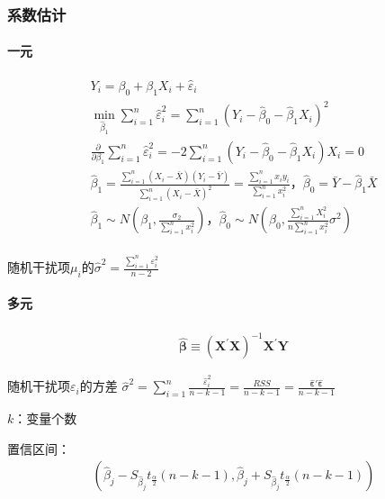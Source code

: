 \documentclass[12pt]{book}
\begin{document}
\subsubsection{系数估计}

\paragraph{一元}


\begin{gather*}
    Y_i = \beta_0+\beta_{1}X_{i}+{\hat{\varepsilon}}_i\\
    \min_{{\hat{\beta}}_1}{\sum_{i=1}^{n}{\hat{\varepsilon}}_i^2} =\sum_{i=1}^{n}{\left(Y_i-{\hat{\beta}}_0-{\hat{\beta}}_1 X_i\right)^2}\\
    \frac{\partial}{\partial \beta_{1}}  \sum_{i=1}^{n}{\hat{ε}_i^2} =-2\sum_{i=1}^{n}{(Y_i-\hat{\beta}_{0}-\hat{\beta}_{1} X_i) X_{i}}=0\\
    \hat{\beta}_{1} = \frac{\sum_{i=1}^{n}\left(X_i-\bar{X}\right)\left(Y_i-\bar{Y}\right)}{\sum_{i=1}^{n}\left(X_i-\bar{X}\right)^2}=\frac{\sum_{i=1}^{n}{x_i y_i}}{\sum_{i=1}^{n}x_i^2}，\hat{\beta}_{0}=\bar{Y}-\hat{\beta}_{1}\bar{X}\\
    {\hat{\beta}}_1 \sim N\left(\beta_1,\frac{\sigma_2}{\sum_{i=1}^{n}{x_i^2}}\right)，\hat{\beta}_{0} \sim N\left(\beta_0, \frac{\sum_{i=1}^{n}{X_i^2}}{ n \sum_{i=1}^{n}{x_i^2}} \sigma^2\right)\\
\end{gather*}


随机干扰项$\mu_{i}$的$\hat{\sigma}^2 =\frac{\sum_{i=1}^{n}{\varepsilon_i^2}}{n-2}$

\paragraph{多元}

\begin{gather*}
    \hat{\bm{\beta}} \equiv \left(\bm{X}^\prime\bm{X}\right)^{-1}\bm{X}^\prime\bm{Y}
\end{gather*}

随机干扰项$\varepsilon_i$的方差
$\hat{\sigma}^2  = \sum_{i=1}^{n}{ 	\frac{ \hat{\varepsilon}_i^2 }{n-k-1} 	} = \frac{RSS}{n-k-1} = \frac{\bm{\hat{\varepsilon}'\hat{\varepsilon}}}{n-k-1}$

$k$：变量个数

置信区间：
\begin{gather*}
    \left( \hat{\beta}_j-S_{\hat{\beta}_j} t_{\frac{\alpha}{2}}(n-k-1), \hat{\beta}_j+S_{\hat{\beta}_j} t_{\frac{\alpha}{2}}(n-k-1) \right)
\end{gather*}
\end{document}
